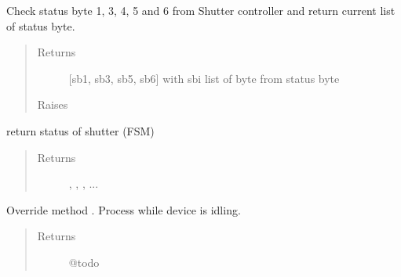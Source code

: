 \documentclass[letterpaper,10pt,english]{sphinxmanual}
\begin{document}
\begin{fulllineitems}

\begin{fulllineitems}
\label{enuActor.Devices:enuActor.Devices.shutter.Shutter.STATUS_BYTE_6}
\end{fulllineitems}


\begin{fulllineitems}
\label{enuActor.Devices:enuActor.Devices.shutter.Shutter.check_status}
Check status byte 1, 3, 4, 5 and 6 from Shutter controller            and return current list of status byte.
\begin{quote}\begin{description}
\item[{Returns}] \leavevmode
{[}sb1, sb3, sb5, sb6{]} with sbi         list of byte from status byte

\item[{Raises}] \leavevmode
{\hyperref[enuActor.Devices:enuActor.Devices.Error.CommErr]{}}

\end{description}\end{quote}

\end{fulllineitems}


\begin{fulllineitems}
\label{enuActor.Devices:enuActor.Devices.shutter.Shutter.getStatus}
return status of shutter (FSM)
\begin{quote}\begin{description}
\item[{Returns}] \leavevmode
{}, , , ...

\end{description}\end{quote}

\end{fulllineitems}


\begin{fulllineitems}
\label{enuActor.Devices:enuActor.Devices.shutter.Shutter.handleTimeout}
Override method {\hyperref[enuActor:enuActor.QThread.QThread.handleTimeout]{}}.
Process while device is idling.
\begin{quote}\begin{description}
\item[{Returns}] \leavevmode
@todo


\end{description}
\end{quote}
\end{fulllineitems}
\end{fulllineitems}
\end{document}

